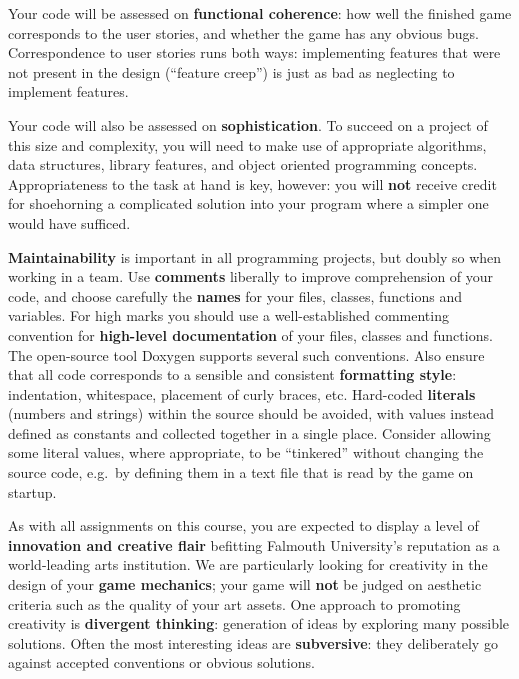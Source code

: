\documentclass{../fal_assignment}
\begin{document}
Your code will be assessed on \textbf{functional coherence}:
how well the finished game corresponds to the user stories,
and whether the game has any obvious bugs.
Correspondence to user stories runs both ways:
implementing features that were not present in the design (``feature creep'')
is just as bad as neglecting to implement features.

Your code will also be assessed on \textbf{sophistication}.
To succeed on a project of this size and complexity,
you will need to make use of appropriate algorithms, data structures, library features, and object oriented programming concepts.
Appropriateness to the task at hand is key, however:
you will \textbf{not} receive credit for shoehorning a complicated solution into your program
where a simpler one would have sufficed.

\textbf{Maintainability} is important in all programming projects,
but doubly so when working in a team.
Use \textbf{comments} liberally to improve comprehension of your code,
and choose carefully the \textbf{names} for your files, classes, functions and variables.
For high marks you should use a well-established commenting convention
for \textbf{high-level documentation} of your files, classes and functions.
The open-source tool Doxygen supports several such conventions.
Also ensure that all code corresponds to a sensible and consistent \textbf{formatting style}:
indentation, whitespace, placement of curly braces, etc.
Hard-coded \textbf{literals} (numbers and strings) within the source should be avoided,
with values instead defined as constants and collected together in a single place.
Consider allowing some literal values, where appropriate, to be ``tinkered'' without changing the source code,
e.g.\ by defining them in a text file that is read by the game on startup.

As with all assignments on this course, you are expected to display a level of
\textbf{innovation and creative flair} befitting Falmouth University's reputation as a world-leading
arts institution.
We are particularly looking for creativity in the design of your \textbf{game mechanics};
your game will \textbf{not} be judged on aesthetic criteria such as the quality of your art assets.
One approach to promoting creativity is
\textbf{divergent thinking}: generation of ideas by exploring many possible solutions.
Often the most interesting ideas are \textbf{subversive}: they deliberately go against
accepted conventions or obvious solutions.
\end{document}
